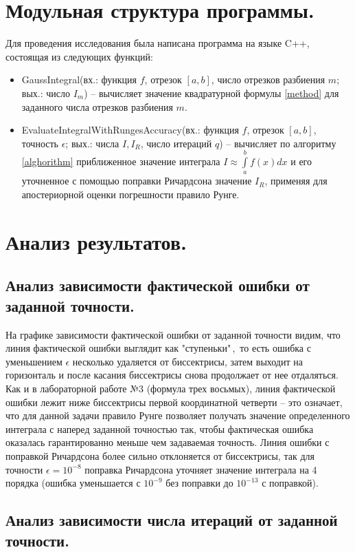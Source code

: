 \documentclass[a4paper, 12pt]{article}
\begin{document}
	\section{Модульная структура программы.}
	Для проведения исследования была написана программа на языке C++, состоящая из следующих функций:
	\begin{itemize}
		\item GaussIntegral(вх.: функция $f$, отрезок $[a,b]$, число отрезков разбиения $m$; вых.: число $I_m$) -- вычисляет значение квадратурной формулы \eqref{method} для заданного числа отрезков разбиения $m$.
		\item EvaluateIntegralWithRungesAccuracy(вх.: функция $f$, отрезок $[a,b]$, точность $\epsilon$; вых.: числа $I, I_R$, число итераций $q$) -- вычисляет по алгоритму \ref{alghorithm} приближенное значение интеграла $I\approx\int\limits_a^bf(x)dx$ и его уточненное с помощью поправки Ричардсона значение $I_R$, применяя для апостериорной оценки погрешности правило Рунге.
	\end{itemize}
	
	\section{Анализ результатов.}
	
	\subsection{Анализ зависимости фактической ошибки от заданной точности.} 
	
	На графике зависимости фактической ошибки от заданной точности видим, что линия фактической ошибки выглядит как "ступеньки"\,,\ то есть ошибка с уменьшением $\epsilon$ несколько удаляется от биссектрисы, затем выходит на горизонталь и после касания биссектрисы снова продолжает от нее отдаляться. Как и в лабораторной работе №3 (формула трех восьмых), линия фактической ошибки лежит ниже биссектрисы первой координатной четверти -- это означает, что для данной задачи правило Рунге позволяет получать значение определенного интеграла с наперед заданной точностью так, чтобы фактическая ошибка оказалась гарантированно меньше чем задаваемая точность. Линия ошибки с поправкой Ричардсона более сильно отклоняется от биссектрисы, так для точности $\epsilon=10^{-8}$ поправка Ричардсона уточняет значение интеграла на 4 порядка (ошибка уменьшается с $10^{-9}$ без поправки до $10^{-13}$ с поправкой). 
	
	\subsection{Анализ зависимости числа итераций от заданной точности.}
	
\end{document}
